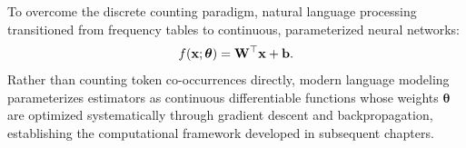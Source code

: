 \documentclass[../../main.tex]{subfiles}
\begin{document}
To overcome the discrete counting paradigm, natural language processing transitioned from frequency tables to continuous, parameterized neural networks:
\begin{equation}
\label{eq:linear_model_intro}
f(\mathbf{x}; \bm{\theta}) = \mathbf{W}^\top \mathbf{x} + \mathbf{b}.
\end{equation}
Rather than counting token co-occurrences directly, modern language modeling parameterizes estimators as continuous differentiable functions whose weights $\bm{\theta}$ are optimized systematically through gradient descent and backpropagation, establishing the computational framework developed in subsequent chapters.

\clearpage
\thispagestyle{empty}
\null
\clearpage
\end{document}
